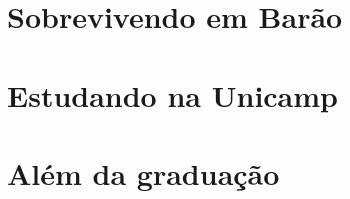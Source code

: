 \documentclass[a4paper,10pt,oldfontcommands]{memoir}
\begin{document}

\clearpage



\chapter{Sobrevivendo em Barão}

\newpage

\newpage

\newpage

\newpage


\chapter{Estudando na Unicamp}

\newpage

\newpage

\newpage

\newpage

\newpage

\newpage

\newpage

\newpage

\newpage


\chapter{Além da graduação}

\newpage

\newpage

\newpage

\newpage

\newpage

\newpage

\end{document}
